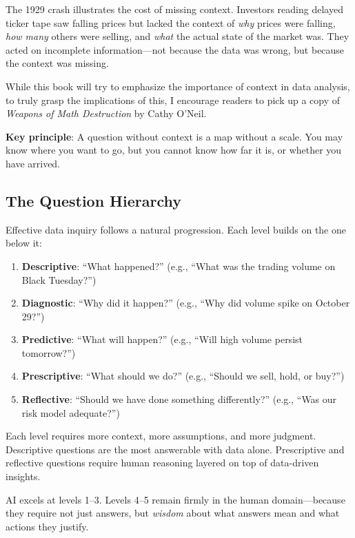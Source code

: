 The 1929 crash illustrates the cost of missing context. Investors reading delayed ticker tape saw falling prices but lacked the context of \textit{why} prices were falling, \textit{how many} others were selling, and \textit{what} the actual state of the market was. They acted on incomplete information---not because the data was wrong, but because the context was missing.

While this book will try to emphasize the importance of context in data analysis, to truly grasp the implications of this, I encourage readers to pick up a copy of \textit{Weapons of Math Destruction} by Cathy O'Neil.

\textbf{Key principle}: A question without context is a map without a scale. You may know where you want to go, but you cannot know how far it is, or whether you have arrived.

\subsection{The Question Hierarchy}

Effective data inquiry follows a natural progression. Each level builds on the one below it:

\begin{enumerate}
    \item \textbf{Descriptive}: ``What happened?'' (e.g., ``What was the trading volume on Black Tuesday?'')
    \item \textbf{Diagnostic}: ``Why did it happen?'' (e.g., ``Why did volume spike on October 29?'')
    \item \textbf{Predictive}: ``What will happen?'' (e.g., ``Will high volume persist tomorrow?'')
    \item \textbf{Prescriptive}: ``What should we do?'' (e.g., ``Should we sell, hold, or buy?'')
    \item \textbf{Reflective}: ``Should we have done something differently?'' (e.g., ``Was our risk model adequate?'')
\end{enumerate}

Each level requires more context, more assumptions, and more judgment. Descriptive questions are the most answerable with data alone. Prescriptive and reflective questions require human reasoning layered on top of data-driven insights.

AI excels at levels 1--3. Levels 4--5 remain firmly in the human domain---because they require not just answers, but \textit{wisdom} about what answers mean and what actions they justify.